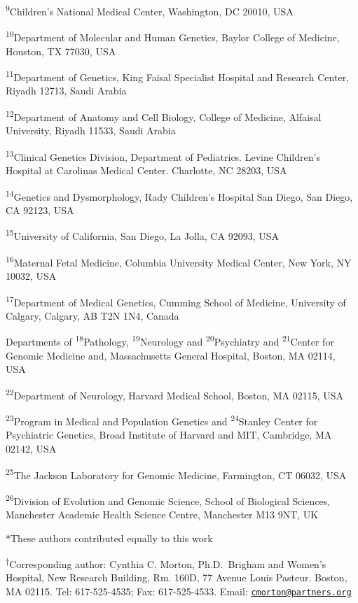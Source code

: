 \documentclass[a4paper,twoside=true,openright,parskip=full,chapterprefix=true,11pt,headings=normal,bibliography=totoc,listof=totoc,titlepage=on,captions=tableabove,draft=false]{scrreprt}
\theoremstyle{definition}
\theoremstyle{definition}
\theoremstyle{definition}
\theoremstyle{remark}
\begin{document}
\textsuperscript{9}Children's National Medical Center, Washington, DC
20010, USA

\textsuperscript{10}Department of Molecular and Human Genetics, Baylor
College of Medicine, Houston, TX 77030, USA

\textsuperscript{11}Department of Genetics, King Faisal Specialist
Hospital and Research Center, Riyadh 12713, Saudi Arabia

\textsuperscript{12}Department of Anatomy and Cell Biology, College of
Medicine, Alfaisal University, Riyadh 11533, Saudi Arabia

\textsuperscript{13}Clinical Genetics Division, Department of
Pediatrics. Levine Children's Hospital at Carolinas Medical Center.
Charlotte, NC 28203, USA

\textsuperscript{14}Genetics and Dysmorphology, Rady Children's Hospital
San Diego, San Diego, CA 92123, USA

\textsuperscript{15}University of California, San Diego, La Jolla, CA
92093, USA

\textsuperscript{16}Maternal Fetal Medicine, Columbia University Medical
Center, New York, NY 10032, USA

\textsuperscript{17}Department of Medical Genetics, Cumming School of
Medicine, University of Calgary, Calgary, AB T2N 1N4, Canada

Departments of \textsuperscript{18}Pathology,
\textsuperscript{19}Neurology and \textsuperscript{20}Psychiatry and
\textsuperscript{21}Center for Genomic Medicine and, Massachusetts
General Hospital, Boston, MA 02114, USA

\textsuperscript{22}Department of Neurology, Harvard Medical School,
Boston, MA 02115, USA

\textsuperscript{23}Program in Medical and Population Genetics and
\textsuperscript{24}Stanley Center for Psychiatric Genetics, Broad
Institute of Harvard and MIT, Cambridge, MA 02142, USA

\textsuperscript{25}The Jackson Laboratory for Genomic Medicine,
Farmington, CT 06032, USA

\textsuperscript{26}Division of Evolution and Genomic Science, School of
Biological Sciences, Manchester Academic Health Science Centre,
Manchester M13 9NT, UK

*These authors contributed equally to this work

\textsuperscript{†}Corresponding author: Cynthia C. Morton,
Ph.D.~Brigham and Women's Hospital, New Research Building, Rm. 160D, 77
Avenue Louis Pasteur. Boston, MA 02115. Tel: 617-525-4535; Fax:
617-525-4533. Email:
\href{mailto:cmorton@partners.org}{\nolinkurl{cmorton@partners.org}}
\end{document}

